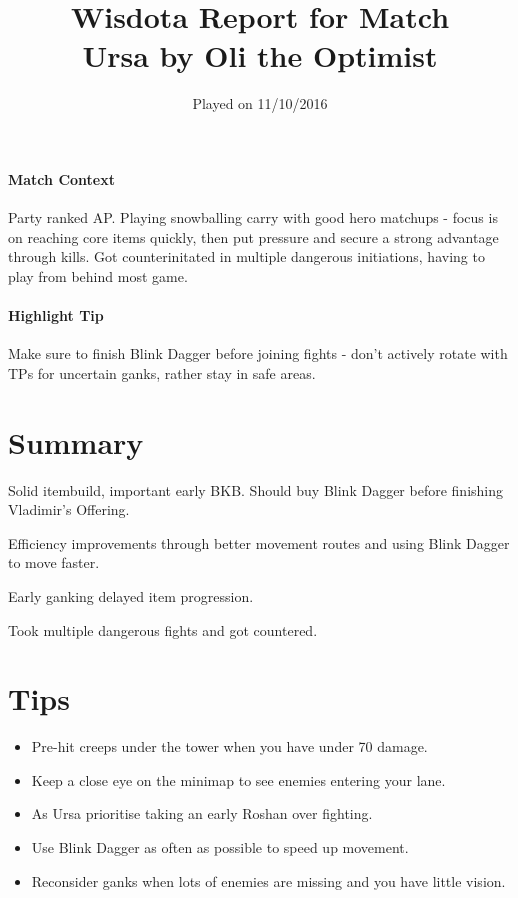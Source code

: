 \documentclass{article}
\title{Wisdota Report for Match \matchid \\
Ursa by Oli the Optimist}
\date{Played on 11/10/2016}
\author{}
\newcommand{\gt}{\ensuremath{\;\;\color{green} \filledmedtriangleup} }
\newcommand{\rt}{\ensuremath{\;\;\color{red} \filledmedtriangledown} }
\newcommand{\ws}{\ensuremath{\;\;\color{white} \filledmedsquare} }
\newenvironment{remarks}
    {
        \begin{description}
            \setlength\itemsep{0em}
    }
    {
        \end{description}
    }
\newcommand{\goodremark}[1]{\item[\gt] #1}
\newcommand{\neutralremark}[1]{\item[\ws] #1}
\newcommand{\badremark}[1]{\item[\rt] #1}
\begin{document}
\pagecolor{WisdotaBackground}
\color{white}

\maketitle
\thispagestyle{first-page}

\paragraph{Match Context}
Party ranked AP. Playing snowballing carry with good hero matchups - focus is on reaching core items quickly, then put pressure and secure a strong advantage through kills. Got counterinitated in multiple dangerous initiations, having to play from behind most game.

\paragraph{Highlight Tip}
Make sure to finish Blink Dagger before joining fights - don't actively rotate with TPs for uncertain ganks, rather stay in safe areas.

\section*{Summary}

\begin{remarks}
\goodremark{Solid itembuild, important early BKB. Should buy Blink Dagger before finishing Vladimir's Offering. }
\neutralremark{Efficiency improvements through better movement routes and using Blink Dagger to move faster. }
\badremark{Early ganking delayed item progression.}
\badremark{Took multiple dangerous fights and got countered.}
\end{remarks}

\section{Tips}

\begin{itemize}
    \item Pre-hit creeps under the tower when you have under 70 damage.
    \item Keep a close eye on the minimap to see enemies entering your lane.
    \item As Ursa prioritise taking an early Roshan over fighting.
    \item Use Blink Dagger as often as possible to speed up movement.
    \item Reconsider ganks when lots of enemies are missing and you have little vision.
\end{itemize}
\end{document}
